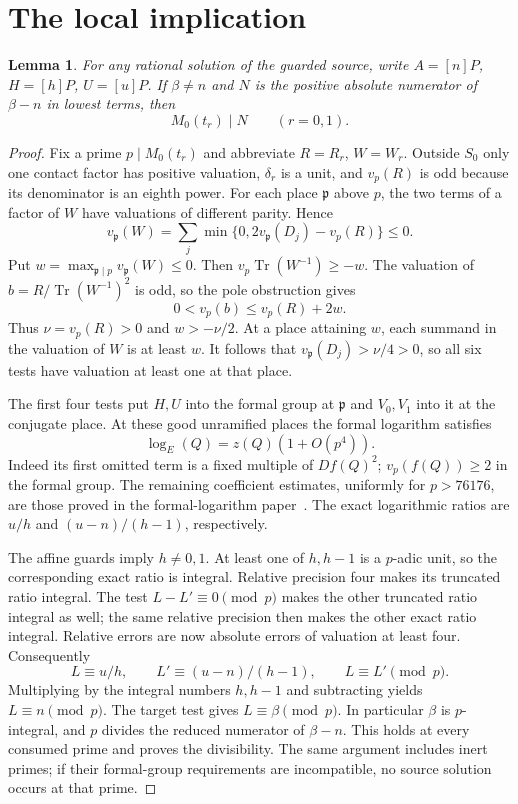 \documentclass[11pt,a4paper]{article}
\newtheorem{lemma}[theorem]{Lemma}
\DeclareMathOperator{\Tr}{Tr}\DeclareMathOperator{\rad}{rad}
\begin{document}
\section{The local implication}

\begin{lemma}\label{lem:local}
For any rational solution of the guarded source, write
$A=[n]P$, $H=[h]P$, $U=[u]P$.
If $\beta\ne n$ and $N$ is the positive absolute numerator
of $\beta-n$ in lowest terms, then
\[
                         M_0(t_r)\mid N\qquad(r=0,1).
\]
\end{lemma}
\begin{proof}
Fix a prime $p\mid M_0(t_r)$ and abbreviate $R=R_r$, $W=W_r$.
Outside $S_0$ only one contact factor has positive valuation,
$\delta_r$ is a unit, and $v_p(R)$ is odd because its denominator is an eighth power. For each place $\mathfrak p$ above $p$, the two terms
of a factor of $W$ have valuations of different parity. Hence
\[
 v_{\mathfrak p}(W)=\sum_j
       \min\{0,2v_{\mathfrak p}(D_j)-v_p(R)\}\le0.
\]
Put $w=\max_{\mathfrak p\mid p}v_{\mathfrak p}(W)\le0$.
Then $v_p\Tr(W^{-1})\ge-w$.
The valuation of $b=R/\Tr(W^{-1})^2$ is odd, so the pole
obstruction gives
\[
                   0<v_p(b)\le v_p(R)+2w.
\]
Thus $\nu=v_p(R)>0$ and $w>-\nu/2$. At a place attaining
$w$, each summand in the valuation of $W$ is at least $w$.
It follows that $v_{\mathfrak p}(D_j)>\nu/4>0$, so all
six tests have valuation at least one at that place.

The first four tests put $H,U$ into the formal group at
$\mathfrak p$ and $V_0,V_1$ into it at the conjugate place.
At these good unramified places the formal logarithm satisfies
\[
                         \log_E(Q)=z(Q)(1+O(p^4)).
\]
Indeed its first omitted term is a fixed multiple of $Df(Q)^2$;
$v_p(f(Q))\ge2$ in the formal group. The remaining coefficient
estimates, uniformly for $p>76176$, are those proved in the
formal-logarithm paper~\cite{Logs}. The exact logarithmic ratios
are $u/h$ and $(u-n)/(h-1)$, respectively.

The affine guards imply $h\ne0,1$. At least one of $h,h-1$
is a $p$-adic unit, so the corresponding exact ratio is integral.
Relative precision four makes its truncated ratio integral.
The test $L-L'\equiv0\pmod p$ makes the other truncated ratio
integral as well; the same relative precision then makes the
other exact ratio integral. Relative errors are now absolute
errors of valuation at least four. Consequently
\[
 L\equiv u/h,\qquad L'\equiv(u-n)/(h-1),\qquad
 L\equiv L'\pmod p.
\]
Multiplying by the integral numbers $h,h-1$ and subtracting yields
$L\equiv n\pmod p$. The target test gives $L\equiv\beta\pmod p$.
In particular $\beta$ is $p$-integral, and $p$ divides the
reduced numerator of $\beta-n$. This holds at every consumed
prime and proves the divisibility. The same argument includes
inert primes; if their formal-group requirements are incompatible,
no source solution occurs at that prime.
\end{proof}
\end{document}
